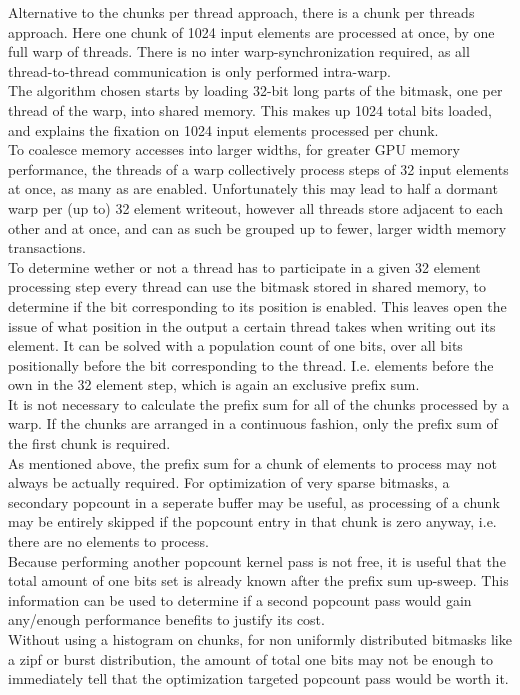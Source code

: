 \documentclass{tudscrreprt}
\begin{document}
			Alternative to the chunks per thread approach, there is a chunk per threads approach. Here one chunk of 1024 input elements are processed at once, by one full warp of threads. There is no inter warp-synchronization required, as all thread-to-thread communication is only performed intra-warp. \\
			The algorithm chosen starts by loading 32-bit long parts of the bitmask, one per thread of the warp, into shared memory. This makes up 1024 total bits loaded, and explains the fixation on 1024 input elements processed per chunk. \\
			To coalesce memory accesses into larger widths, for greater GPU memory performance, the threads of a warp collectively process steps of 32 input elements at once, as many as are enabled. Unfortunately this may lead to half a dormant warp per (up to) 32 element writeout, however all threads store adjacent to each other and at once, and can as such be grouped up to fewer, larger width memory transactions. \\
			To determine wether or not a thread has to participate in a given 32 element processing step every thread can use the bitmask stored in shared memory, to determine if the bit corresponding to its position is enabled. This leaves open the issue of what position in the output a certain thread takes when writing out its element. It can be solved with a population count of one bits, over all bits positionally before the bit corresponding to the thread. I.e. elements before the own in the 32 element step, which is again an exclusive prefix sum. \\
			It is not necessary to calculate the prefix sum for all of the chunks processed by a warp. If the chunks are arranged in a continuous fashion, only the prefix sum of the first chunk is required. \\
			
			As mentioned above, the prefix sum for a chunk of elements to process may not always be actually required. For optimization of very sparse bitmasks, a secondary popcount in a seperate buffer may be useful, as processing of a chunk may be entirely skipped if the popcount entry in that chunk is zero anyway, i.e. there are no elements to process. \\
			Because performing another popcount kernel pass is not free, it is useful that the total amount of one bits set is already known after the prefix sum up-sweep. This information can be used to determine if a second popcount pass would gain any/enough performance benefits to justify its cost. \\
			Without using a histogram on chunks, for non uniformly distributed bitmasks like a zipf or burst distribution, the amount of total one bits may not be enough to immediately tell that the optimization targeted popcount pass would be worth it. \\
			
\end{document}
